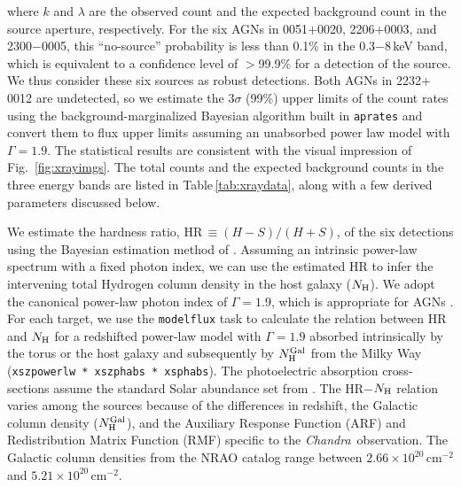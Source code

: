 \documentclass[iop,revtex4,twocolumn,apj,numberedappendix,appendixfloats]{emulateapj}
\newcommand{\chandra}{{\it Chandra}}
\begin{document}
where $k$ and $\lambda$ are the observed count and the expected background count in the source aperture, respectively. For the six AGNs in 0051$+$0020, 2206$+$0003, and 2300$-$0005, this ``no-source'' probability is less than 0.1\% in the 0.3$-$8\,keV band, which is equivalent to a confidence level of $>$99.9\% for a detection of the source. We thus consider these six sources as robust detections. Both AGNs in 2232$+$0012 are undetected, so we estimate the 3$\sigma$ (99\%) upper limits of the count rates using the background-marginalized Bayesian algorithm built in \texttt{aprates} and convert them to flux upper limits assuming an unabsorbed power law model with $\Gamma = 1.9$. The statistical results are consistent with the visual impression of Fig.~\ref{fig:xrayimgs}. The total counts and the expected background counts in the three energy bands are listed in Table\,\ref{tab:xraydata}, along with a few derived parameters discussed below.

We estimate the hardness ratio, HR\,$\equiv (H-S)/(H+S)$, of the six detections using the Bayesian estimation method of \citet{Park06}. Assuming an intrinsic power-law spectrum with a fixed photon index, we can use the estimated HR to infer the intervening total Hydrogen column density in the host galaxy ($N_{\rm H}$). We adopt the canonical power-law photon index of $\Gamma = 1.9$, which is appropriate for AGNs \citep[e.g.,][]{Just07,She17}. For each target, we use the \texttt{modelflux} task to calculate the relation between HR and $N_{\rm H}$ for a redshifted power-law model with $\Gamma = 1.9$ absorbed intrinsically by the torus or the host galaxy and subsequently by $N_{\rm H}^{\rm Gal}$ from the Milky Way (\texttt{xszpowerlw * xszphabs * xsphabs}). The photoelectric absorption cross-sections \citep{Morrison83} assume the standard Solar abundance set from \citet{Anders89}. The HR$-$$N_{\rm H}$ relation varies among the sources because of the differences in redshift, the Galactic column density ($N_{\rm H}^{\rm Gal}$), and the Auxiliary Response Function (ARF) and Redistribution Matrix Function (RMF) specific to the \chandra\ observation. The Galactic column densities from the NRAO catalog \citep{Dickey90} range between $2.66\times10^{20}$\,cm$^{-2}$ and $5.21\times10^{20}$\,cm$^{-2}$. 
\end{document}
